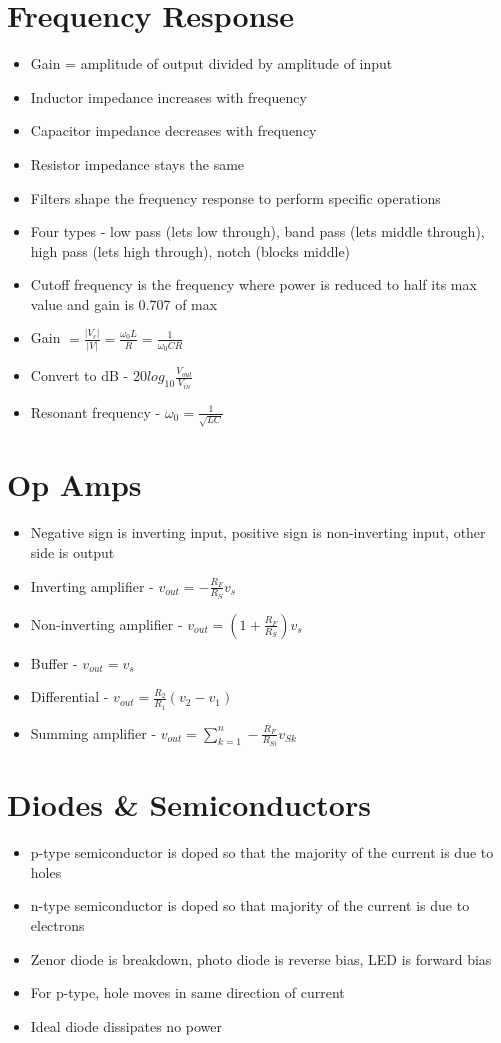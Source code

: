 \documentclass [12pt] {article}
\begin{document}
\begin{multicols*}{2}
	\section{Frequency Response}
	\begin{itemize}
		\item Gain = amplitude of output divided by amplitude of input
		\item Inductor impedance increases with frequency
		\item Capacitor impedance decreases with frequency
		\item Resistor impedance stays the same
		\item Filters shape the frequency response to perform specific operations
		\item Four types - low pass (lets low through), band pass (lets middle through), high pass (lets high through), notch (blocks middle)
		\item Cutoff frequency is the frequency where power is reduced to half its max value and gain is 0.707 of max
		\item Gain $= \frac{|V_c|}{|V|} = \frac{\omega_0L}{R} = \frac{1}{\omega_0CR}$
		\item Convert to dB - $20log_{10}\frac{V_{out}}{V_{in}}$
		\item Resonant frequency - $\omega_0 = \frac{1}{\sqrt{LC}}$
	\end{itemize}
	\section{Op Amps}
	\begin{itemize}
		\item Negative sign is inverting input, positive sign is non-inverting input, other side is output
		\item Inverting amplifier - $v_{out} = -\frac{R_F}{R_S}v_s$
		\item Non-inverting amplifier - $v_{out} = \left(1 + \frac{R_F}{R_S}\right)v_s$
		\item Buffer - $v_{out} = v_s$
		\item Differential - $v_{out} = \frac{R_2}{R_1}(v_2 - v_1)$
		\item Summing amplifier - $v_{out} = \sum\limits_{k=1}^n -\frac{R_F}{R_{Si}}v_{Sk}$
	\end{itemize}
	\section{Diodes \& Semiconductors}
	\begin{itemize}
		\item p-type semiconductor is doped so that the majority of the current is due to holes
		\item n-type semiconductor is doped so that majority of the current is due to electrons
		\item Zenor diode is breakdown, photo diode is reverse bias, LED is forward bias
		\item For p-type, hole moves in same direction of current
		\item Ideal diode dissipates no power
	\end{itemize}

\end{multicols*}
\end{document}
